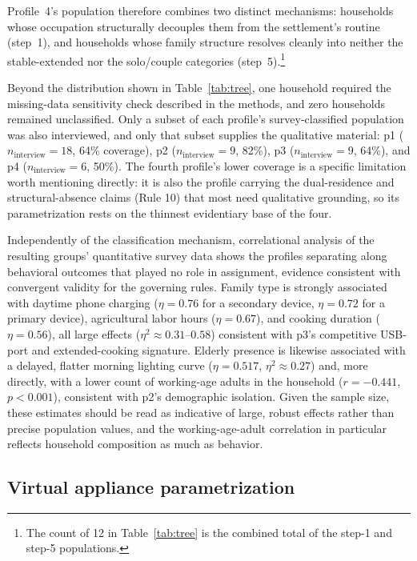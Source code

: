 \documentclass[final,3p,times,onecolumn]{elsarticle}
\begin{document}
Profile~4's population therefore combines two distinct mechanisms: households whose occupation structurally decouples them from the settlement's routine (step~1), and households whose family structure resolves cleanly into neither the stable-extended nor the solo/couple categories (step~5).\footnote{The count of 12 in Table~\ref{tab:tree} is the combined total of the step-1 and step-5 populations.}

Beyond the distribution shown in Table~\ref{tab:tree}, one household required the missing-data sensitivity check described in the methods, and zero households remained unclassified. Only a subset of each profile's survey-classified population was also interviewed, and only that subset supplies the qualitative material: \gls{p1} ($n_{\text{interview}}=18$, 64\% coverage), \gls{p2} ($n_{\text{interview}}=9$, 82\%), \gls{p3} ($n_{\text{interview}}=9$, 64\%), and \gls{p4} ($n_{\text{interview}}=6$, 50\%). The fourth profile's lower coverage is a specific limitation worth mentioning directly: it is also the profile carrying the dual-residence and structural-absence claims (Rule 10) that most need qualitative grounding, so its parametrization rests on the thinnest evidentiary base of the four.

Independently of the classification mechanism, correlational analysis of the resulting groups' quantitative survey data shows the profiles separating along behavioral outcomes that played no role in assignment, evidence consistent with convergent validity for the governing rules. Family type is strongly associated with daytime phone charging ($\eta = 0.76$ for a secondary device, $\eta = 0.72$ for a primary device), agricultural labor hours ($\eta = 0.67$), and cooking duration ($\eta = 0.56$), all large effects ($\eta^2 \approx 0.31$--$0.58$) consistent with \gls{p3}'s competitive USB-port and extended-cooking signature. Elderly presence is likewise associated with a delayed, flatter morning lighting curve ($\eta = 0.517$, $\eta^2 \approx 0.27$) and, more directly, with a lower count of working-age adults in the household ($r = -0.441$, $p < 0.001$), consistent with \gls{p2}'s demographic isolation. Given the sample size, these estimates should be read as indicative of large, robust effects rather than precise population values, and the working-age-adult correlation in particular reflects household composition as much as behavior.


\subsection{Virtual appliance parametrization}
\label{sec:va_parametrization}
\end{document}

